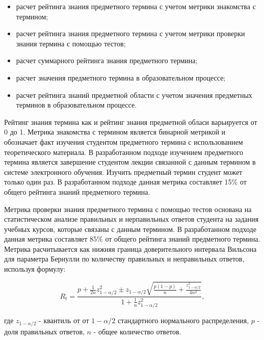 \begin{itemize}
\item расчет рейтинга знания предметного термина с учетом метрики знакомства с термином;
\item расчет рейтинга знания предметного термина с учетом метрики проверки знания термина с помощью тестов;
\item расчет суммарного рейтинга знания предметного термина;
\item расчет значения предметного термина в образовательном процессе;
\item расчет рейтинга знаний предметной области с учетом значения предметных терминов в образовательном процессе.
\end{itemize}

Рейтинг знания термина как и рейтинг знания предметной обласи варьируется от 0 до 1. Метрика знакомства с термином является бинарной метрикой и обозначает факт изучения студентом предметного термина с использованием теоретического материала. В разработанном подходе изучением предметного термина является завершение студентом лекции связанной с данным термином в системе электронного обучения. Изучить предметный термин студент может только один раз. В разработанном подходе данная метрика составляет 15\% от общего рейтинга знаний предметного термина.

Метрика проверки знания предметного термина с помощью тестов основана на статистическом анализе правильных и нерпавильных ответов студента на задания учебных курсов, которые связаны с данным термином. В разработанном подходе данная метрика составляет 85\% от общего рейтинга знаний предметного термина. Метрика расчитывается как нижняя граница доверительного интервала Вильсона для параметра Бернулли по количеству правильных и неправильных ответов, используя формулу:

$$
    R_t = \frac{p+\frac{1}{2n}z_{1-\alpha/2}^2 \pm z_{1-\alpha/2}\sqrt{\frac{p(1-p)}{n}+\frac{z_{1-\alpha/2}^2}{4n^2}}{} }{1+\frac{1}{n}z_{1-\alpha/2}^2},
$$

где \(z_{1-\alpha/2}\) - квантиль от от \(1-\alpha/2\) стандартного нормального распределения, \(p\) - доля правильных ответов, \(n\) - общее количество ответов. 

